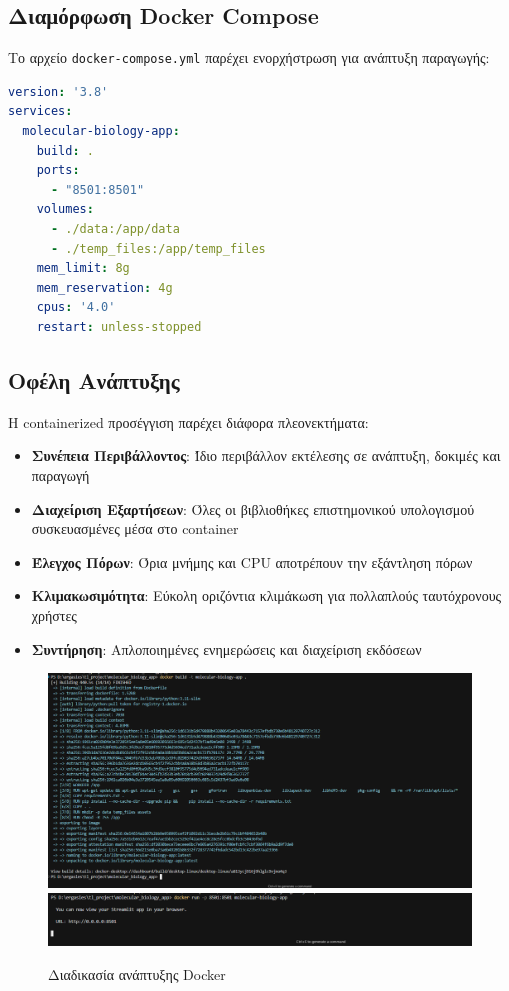 \documentclass[11pt,a4paper]{article}
\begin{document}
\subsection{Διαμόρφωση Docker Compose}

Το αρχείο \texttt{docker-compose.yml} παρέχει ενορχήστρωση για ανάπτυξη παραγωγής:

\begin{lstlisting}[language=YAML, caption={Διαμόρφωση Docker Compose}]
version: '3.8'
services:
  molecular-biology-app:
    build: .
    ports:
      - "8501:8501"
    volumes:
      - ./data:/app/data
      - ./temp_files:/app/temp_files
    mem_limit: 8g
    mem_reservation: 4g
    cpus: '4.0'
    restart: unless-stopped
\end{lstlisting}

\subsection{Οφέλη Ανάπτυξης}

Η containerized προσέγγιση παρέχει διάφορα πλεονεκτήματα:

\begin{itemize}
    \item \textbf{Συνέπεια Περιβάλλοντος}: Ίδιο περιβάλλον εκτέλεσης σε ανάπτυξη, δοκιμές και παραγωγή
    \item \textbf{Διαχείριση Εξαρτήσεων}: Όλες οι βιβλιοθήκες επιστημονικού υπολογισμού συσκευασμένες μέσα στο container
    \item \textbf{Έλεγχος Πόρων}: Όρια μνήμης και CPU αποτρέπουν την εξάντληση πόρων
    \item \textbf{Κλιμακωσιμότητα}: Εύκολη οριζόντια κλιμάκωση για πολλαπλούς ταυτόχρονους χρήστες
    \item \textbf{Συντήρηση}: Απλοποιημένες ενημερώσεις και διαχείριση εκδόσεων
\end{itemize}

\begin{figure}[H]
    \centering
    \includegraphics[width=1.0\linewidth]{docker_build.png}
    \includegraphics[width=1.0\linewidth]{docker_run.png}
    \caption{Διαδικασία ανάπτυξης Docker}
    \label{fig:docker_deployment}
\end{figure}
\end{document}
